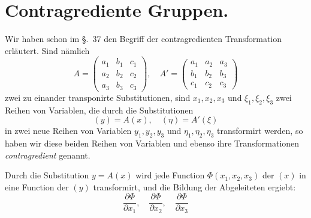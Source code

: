 \documentclass[12pt,a4paper]{article}
\begin{document}
\newpage
\section{Contragrediente Gruppen.}
\label{sec:129}

Wir haben schon im \S.~37 den Begriff der contragredienten Transformation erl\"autert. Sind n\"amlich
\[ A = \begin{pmatrix} a_1 & b_1 & c_1 \\ a_2 & b_2 & c_2 \\ a_3 & b_3 & c_3 \end{pmatrix}, \quad A' = \begin{pmatrix} a_1 & a_2 & a_3 \\ b_1 & b_2 & b_3 \\ c_1 & c_2 & c_3 \end{pmatrix} \]
zwei zu einander transponirte Substitutionen, sind $x_1, x_2, x_3$ und $\xi_1, \xi_2, \xi_3$ zwei Reihen von Variablen, die durch die Substitutionen
\begin{equation}
\label{eq:contrag} (y) = A(x), \quad (\eta) = A'(\xi)
\end{equation}
in zwei neue Reihen von Variablen $y_1, y_2, y_3$ und $\eta_1, \eta_2, \eta_3$ transformirt werden, so haben wir diese beiden Reihen von Variablen und ebenso ihre Transformationen \textit{contragredient} genannt.

Durch die Substitution $y = A(x)$ wird jede Function $\Phi(x_1, x_2, x_3)$ der $(x)$ in eine Function der $(y)$ transformirt, und die Bildung der Abgeleiteten ergiebt:
\begin{equation}
\label{eq:ableit} \frac{\partial \Phi}{\partial x_1}, \quad \frac{\partial \Phi}{\partial x_2}, \quad \frac{\partial \Phi}{\partial x_3}
\end{equation}
\end{document}
